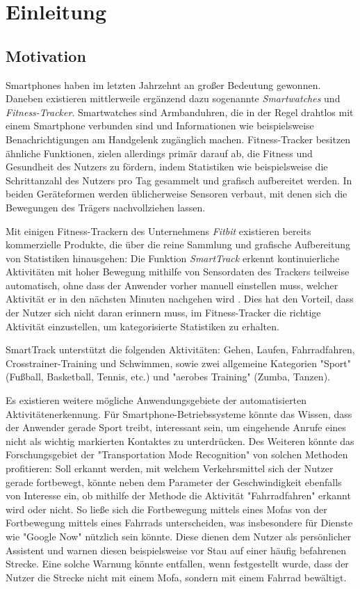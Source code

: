 \chapter{Einleitung}
\label{chap:introduction}
\section{Motivation}
Smartphones haben im letzten Jahrzehnt an großer Bedeutung gewonnen. Daneben existieren mittlerweile ergänzend dazu sogenannte \textit{Smartwatches} und \textit{Fitness-Tracker}. Smartwatches sind Armbanduhren, die in der Regel drahtlos mit einem Smartphone verbunden sind und Informationen wie beispielsweise Benachrichtigungen am Handgelenk zugänglich machen. Fitness-Tracker besitzen ähnliche Funktionen, zielen allerdings primär darauf ab, die Fitness und Gesundheit des Nutzers zu fördern, indem Statistiken wie beispielsweise die Schrittanzahl des Nutzers pro Tag gesammelt und grafisch aufbereitet werden. In beiden Geräteformen werden üblicherweise Sensoren verbaut, mit denen sich die Bewegungen des Trägers nachvollziehen lassen.

Mit einigen Fitness-Trackern des Unternehmens \textit{Fitbit} existieren bereits kommerzielle Produkte, die über die reine Sammlung und grafische Aufbereitung von Statistiken hinausgehen: Die Funktion \textit{SmartTrack} erkennt kontinuierliche Aktivitäten mit hoher Bewegung mithilfe von Sensordaten des Trackers teilweise automatisch, ohne dass der Anwender vorher manuell einstellen muss, welcher Aktivität er in den nächsten Minuten nachgehen wird \cite{FitbitSmartTrack}. Dies hat den Vorteil, dass der Nutzer sich nicht daran erinnern muss, im Fitness-Tracker die richtige Aktivität einzustellen, um kategorisierte Statistiken zu erhalten.

SmartTrack unterstützt die folgenden Aktivitäten: Gehen, Laufen, Fahrradfahren, Crosstrainer-Training und Schwimmen, sowie zwei allgemeine Kategorien "Sport" (Fußball, Basketball, Tennis, etc.) und "aerobes Training" (Zumba, Tanzen).

Es existieren weitere mögliche Anwendungsgebiete der automatisierten Aktivitätenerkennung. Für Smartphone-Betriebssysteme könnte das Wissen, dass der Anwender gerade Sport treibt, interessant sein, um eingehende Anrufe eines nicht als wichtig markierten Kontaktes zu unterdrücken. Des Weiteren könnte das Forschungsgebiet der "Transportation Mode Recognition" von solchen Methoden profitieren: Soll erkannt werden, mit welchem Verkehrsmittel sich der Nutzer gerade fortbewegt, könnte neben dem Parameter der Geschwindigkeit ebenfalls von Interesse ein, ob mithilfe der Methode die Aktivität "Fahrradfahren" erkannt wird oder nicht. So ließe sich die Fortbewegung mittels eines Mofas von der Fortbewegung mittels eines Fahrrads unterscheiden, was insbesondere für Dienste wie "Google Now" nützlich sein könnte. Diese dienen dem Nutzer als persönlicher Assistent und warnen diesen beispielsweise vor Stau auf einer häufig befahrenen Strecke. Eine solche Warnung könnte entfallen, wenn festgestellt wurde, dass der Nutzer die Strecke nicht mit einem Mofa, sondern mit einem Fahrrad bewältigt.

